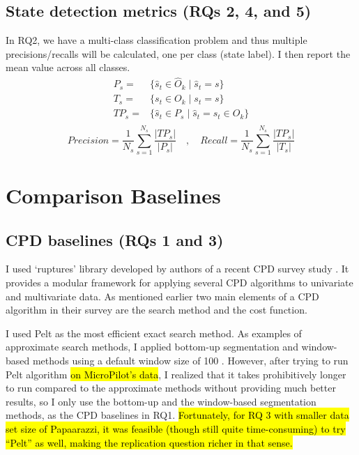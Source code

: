 \subsection{State detection metrics (RQs 2, 4, and 5)}
In RQ2, we have a multi-class classification problem and thus multiple precisions/recalls will be calculated, one per class (state label). I then report the mean value across all classes. 
\begin{equation}
\begin{split}
P_s ={}&{}\big\{\hat{s}_t \in \hat{O}_k \;\big|\; \hat{s}_t = s\big\} \\
T_s ={}&{}\big\{s_t \in O_k \;\big|\; s_t = s\big\} \\
TP_s ={}&{}\big\{\hat{s}_t \in P_s \;\big|\; \hat{s}_t = s_t \in O_k\big\} \\
\end{split}
\end{equation}
$$Precision =\frac{1}{N_s}\sum_{s=1}^{N_s} \frac{|TP_s|}{|P_s|} \quad,\quad Recall = \frac{1}{N_s}\sum_{s=1}^{N_s} \frac{|TP_s|}{|T_s|}$$

\section{Comparison Baselines} 
\subsection{CPD baselines (RQs 1 and 3)} \label{sec:CPD_baseline}
I used `ruptures' library developed by authors of a recent CPD survey study \cite{Truong2018ChangePointSurvey}. It provides a modular framework for applying several CPD algorithms to univariate and multivariate data. %
As mentioned earlier two main elements of a CPD algorithm in their survey are the search method and the cost function.

I used Pelt \cite{killick2012optimal} as the most efficient exact search method. As examples of approximate search methods, I applied bottom-up segmentation and window-based methods using a default window size of 100 \cite{keogh2001online}.
However, after trying to run Pelt algorithm \hl{on MicroPilot's data}, I realized that it takes prohibitively longer to run compared to the approximate methods without providing much better results, so I only use the bottom-up and the window-based segmentation methods, as the CPD baselines in RQ1.
\hl{Fortunately, for RQ 3 with smaller data set size of Papaarazzi, it was feasible (though still quite time-consuming) to try ``Pelt'' as well, making the replication question richer in that sense.}

